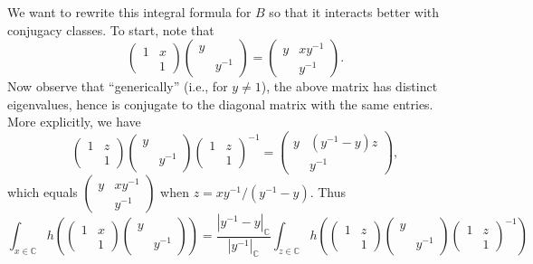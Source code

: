 \documentclass[reqno]{amsart} 
\begin{document}
We want to rewrite this integral formula for $B$ so that it interacts better with conjugacy classes.  To start, note that
\begin{equation}\label{eqn:}
  \begin{pmatrix}
    1 & x \\
    & 1
  \end{pmatrix}
  \begin{pmatrix}
    y &  \\
    & y^{-1}
  \end{pmatrix}
  = 
\begin{pmatrix}
    y & x y^{-1} \\
    & y^{-1}
  \end{pmatrix}
  .
\end{equation}
Now observe that ``generically'' (i.e., for $y \neq 1$), the above matrix has distinct eigenvalues, hence is conjugate to the diagonal matrix with the same entries.  More explicitly, we have
\begin{equation}\label{eqn:}
  \begin{pmatrix}
    1 & z \\
    & 1
  \end{pmatrix}
  \begin{pmatrix}
    y &  \\
    & y^{-1}
  \end{pmatrix}
  \begin{pmatrix}
    1 & z \\
    & 1
  \end{pmatrix}
  ^{-1} =
  \begin{pmatrix}
    y & (y^{-1} - y ) z \\
    & y^{-1}
  \end{pmatrix}
  ,
\end{equation}
which equals $
\begin{pmatrix}
  y & x y^{-1} \\
  & y^{-1}
\end{pmatrix}
$ when $z = x y^{-1} / (y^{-1} - y)$.  Thus
\begin{equation}\label{eqn:sl2-change-of-var}
  \int_{x \in \mathbb{C}}
  h (
\begin{pmatrix}
    1 & x \\
    & 1
  \end{pmatrix} 
\begin{pmatrix}
    y &  \\
    & y ^{-1}
  \end{pmatrix}
  ) = \frac {|y^{-1} - y|_{\mathbb{C}}}{|y^{-1}|_{\mathbb{C}}} \int_{z \in \mathbb{C}} h (
\begin{pmatrix}
    1 & z \\
    & 1
  \end{pmatrix} 
\begin{pmatrix}
    y &  \\
    & y^{-1}
  \end{pmatrix}
  \begin{pmatrix}
    1 & z \\
    & 1
  \end{pmatrix}
  ^{-1} )
\end{equation}
\end{document}
